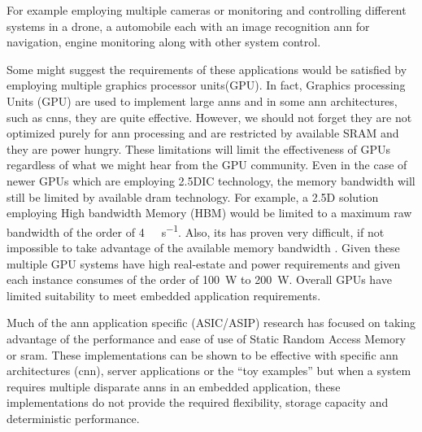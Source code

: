 For example employing multiple cameras or monitoring and controlling different systems in a drone, a automobile each with an image recognition \ac{ann}\cite{krizhevsky2012imagenet}\cite{bojarski2016end} for navigation, engine monitoring along with other system control.
\fi

Some might suggest the requirements of these applications would be satisfied by employing multiple graphics processor units(GPU).
In fact, Graphics processing Units (GPU) are used to implement large \ac{ann}s and in some \ac{ann} architectures, such as \acp{cnn}, they are quite effective. However, we should not forget they are not optimized purely for \ac{ann} processing and are restricted by available SRAM and they are power hungry. These limitations will limit the effectiveness of GPUs regardless of what we might hear from the GPU community.
Even in the case of newer GPUs which are employing 2.5DIC technology, the memory bandwidth will still be limited by available \ac{dram} technology.
For example, a 2.5D solution employing High bandwidth Memory (HBM) would be limited to a maximum raw bandwidth of the order of \SI[per-mode=symbol]{4}{\tera \bit \per \second}.
Also, its has proven very difficult, if not impossible to take advantage of the available memory bandwidth \cite{farabet2011neuflow} \cite{jouppi2017datacenter}.
Given these multiple GPU systems have high real-estate and power requirements and given each instance consumes of the order of \SI{100}{\watt} to \SI{200}{\watt}.
Overall GPUs have limited suitability to meet embedded application requirements.


Much of the \ac{ann} application specific (ASIC/ASIP) research has focused on taking advantage of the performance and ease of use of Static Random Access Memory or \ac{sram}. 
These implementations can be shown to be effective with specific \ac{ann} architectures (\ac{cnn}), server applications or the ``toy examples'' but when a system requires multiple disparate \ac{ann}s in an embedded application, these implementations do not provide the required flexibility, storage capacity and deterministic performance.

\iffalse
How this work addresses the problem are outlined in Section \ref{chap-five}.
\fi
\fi




